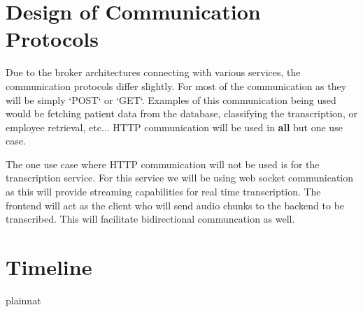 \documentclass[12pt, titlepage]{article}
\begin{document}

\section{Design of Communication Protocols}

Due to the broker architectures connecting with various services, the communication protocols differ slightly. For most of the communication as they will be simply `POST` or `GET`. Examples of this communication being used would be fetching patient data from the database, classifying the transcription, or employee retrieval, etc... HTTP communication will be used in \textbf{all} but one use case.

The one use case where HTTP communication will not be used is for the transcription service. For this service we will be using web socket communication as this will provide streaming capabilities for real time transcription. The frontend will act as the client who will send audio chunks to the backend to be transcribed. This will facilitate bidirectional communcation as well.


\section{Timeline}



 {plainnat}


\newpage{}
\end{document}
